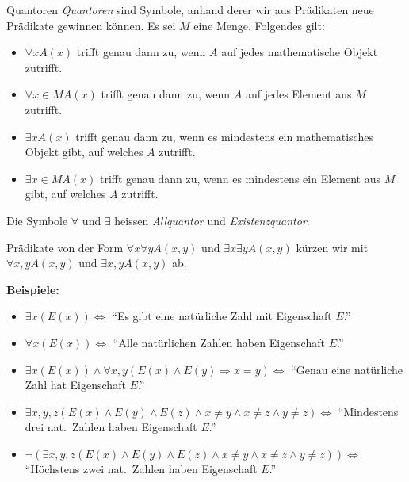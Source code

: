 \begin{definition}{Quantoren}
    \emph{Quantoren} sind Symbole, anhand derer wir aus Prädikaten neue Prädikate gewinnen können.
    Es sei $M$ eine Menge.
    Folgendes gilt:
    \begin{itemize}
        \item $\forall x A(x)$ trifft genau dann zu, wenn $A$ auf jedes mathematische Objekt zutrifft.
        \item $\forall x \in M A(x)$ trifft genau dann zu, wenn $A$ auf jedes Element aus $M$ zutrifft.
        \item $\exists x A(x)$ trifft genau dann zu, wenn es mindestens ein mathematisches Objekt gibt, auf welches $A$ zutrifft.
        \item $\exists x \in M A(x)$ trifft genau dann zu, wenn es mindestens ein Element aus $M$ gibt, auf welches $A$ zutrifft.
    \end{itemize}
    Die Symbole $\forall$ und $\exists$ heissen \emph{Allquantor} und \emph{Existenzquantor}.
\end{definition}

Prädikate von der Form $\forall x \forall y A(x,y)$ und $\exists x \exists y A(x,y)$ kürzen wir mit $\forall x,y A(x,y)$ und $\exists x,y A(x,y)$ ab.

\textbf{Beispiele:}
\vspace{-\topsep}
\begin{itemize}
    \item $\exists x (E(x)) \Leftrightarrow$ ``Es gibt eine natürliche Zahl mit Eigenschaft $E$.''
    \item $\forall x (E(x)) \Leftrightarrow$ ``Alle natürlichen Zahlen haben Eigenschaft $E$.''
    \item $\exists x (E(x)) \land \forall x,y (E(x) \land E(y) \Rightarrow x = y) \Leftrightarrow$ ``Genau eine natürliche Zahl hat Eigenschaft $E$.''
    \item $\exists x,y,z (E(x) \land E(y) \land E(z) \land x \neq y \land x \neq z \land y \neq z) \Leftrightarrow$ ``Mindestens drei nat.\ Zahlen haben Eigenschaft $E$.''
    \item $\neg (\exists x,y,z (E(x) \land E(y) \land E(z) \land x \neq y \land x \neq z \land y \neq z)) \Leftrightarrow$ ``Höchstens zwei nat.\ Zahlen haben Eigenschaft $E$.''
\end{itemize}

